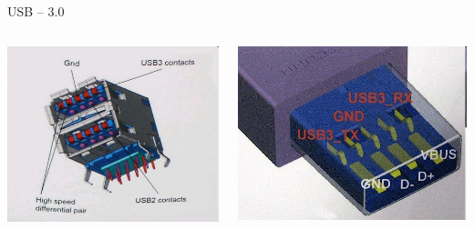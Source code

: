 \documentclass[aspectratio=43]{beamer}
\begin{document}
\begin{frame}{USB – 3.0}
	
	\begin{columns}
		\begin{center}
			\includegraphics[width=1\linewidth]{extrahovane_obrazky/img_3_page15_1.jpeg}
		\end{center}
		\begin{center}
			\includegraphics[width=1\linewidth]{extrahovane_obrazky/img_3_page15_2.jpeg}
		\end{center}
	\end{columns}
	
\end{frame}
\end{document}
